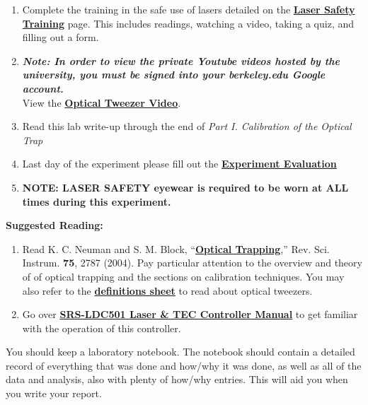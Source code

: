 \documentclass{../lab}
\begin{document}
\begin{enumerate}
    \item Complete the training in the safe use of lasers detailed on the \href{http://experimentationlab.berkeley.edu/LaserSafety}{\textbf{Laser Safety Training}} page. This includes readings, watching a video, taking a quiz, and filling out a form.

    \item \emph{\textbf{Note: In order to view the private Youtube videos hosted by the university, you must be signed into your berkeley.edu Google account.}}\\
    View the \href{http://youtu.be/bqIBcjcAhso}{\textbf{Optical Tweezer Video}}.  

    \item Read this lab write-up through the end of \emph{Part I. Calibration of the Optical Trap}

    \item Last day of the experiment please fill out the \href{\ExperimentEvaluation}{\textbf{Experiment Evaluation}}

    \item \textbf{NOTE: LASER  SAFETY eyewear is required to be worn at ALL times during this experiment.}

\end{enumerate}

\textbf{Suggested Reading:}

\begin{enumerate}
    \item Read K. C. Neuman and S. M. Block, ``\href{http://physics111.lib.berkeley.edu/Physics111/Reprints/OTZ/Neuman-optical_Trapping.pdf}{\textbf{Optical Trapping}},'' Rev. Sci. Instrum. \textbf{75}, 2787 (2004). Pay particular attention to the overview and theory of of optical trapping and the sections on calibration techniques. You may also refer to the \href{http://physics111.lib.berkeley.edu/Physics111/Reprints/OTZ/biowikipedia.pdf}{\textbf{definitions sheet}} to read about optical tweezers.

    \item Go over \href{http://experimentationlab.berkeley.edu/sites/default/files/images/LDC501m.pdf}{\textbf{SRS-LDC501 Laser \& TEC Controller Manual}} to get familiar with the operation of this controller.

\end{enumerate}

You should keep a laboratory notebook. The notebook should contain a detailed record of everything that was done and how/why it was done, as well as all of the data and analysis, also with plenty of how/why entries. This will aid you when you write your report.
\end{document}
